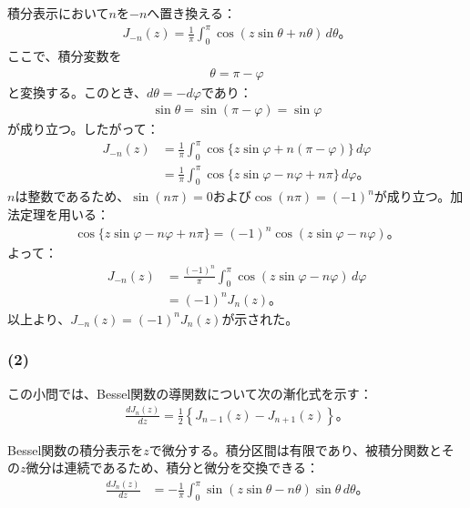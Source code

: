 \documentclass[platex,dvipdfmx,a4paper]{jsarticle}
\newcommand{\bbn}[2]{\frac{d #1}{d #2}}
\begin{document}
  積分表示において$n$を$-n$へ置き換える：
  \begin{align*}
    J_{-n}(z)
    =\frac{1}{\pi}\int_0^\pi\cos(z\sin\theta+n\theta)\,d\theta。
  \end{align*}
  ここで、積分変数を
  \begin{align*}
    \theta=\pi-\varphi
  \end{align*}
  と変換する。このとき、$d\theta=-d\varphi$であり：
  \begin{align*}
    \sin\theta=\sin(\pi-\varphi)=\sin\varphi
  \end{align*}
  が成り立つ。したがって：
  \begin{align*}
    J_{-n}(z)
    &=\frac{1}{\pi}\int_0^\pi
    \cos\{z\sin\varphi+n(\pi-\varphi)\}\,d\varphi\\
    &=\frac{1}{\pi}\int_0^\pi
    \cos\{z\sin\varphi-n\varphi+n\pi\}\,d\varphi。
  \end{align*}
  $n$は整数であるため、$\sin(n\pi)=0$および$\cos(n\pi)=(-1)^n$が成り立つ。加法定理を用いる：
  \begin{align*}
    \cos\{z\sin\varphi-n\varphi+n\pi\}
    =(-1)^n\cos(z\sin\varphi-n\varphi)。
  \end{align*}
  よって：
  \begin{align*}
    J_{-n}(z)
    &=\frac{(-1)^n}{\pi}
    \int_0^\pi\cos(z\sin\varphi-n\varphi)\,d\varphi\\
    &=(-1)^nJ_n(z)。
  \end{align*}
  以上より、$J_{-n}(z)=(-1)^nJ_n(z)$が示された。

  \subsubsection*{(2)}

  この小問では、Bessel関数の導関数について次の漸化式を示す：
  \begin{align*}
    \bbn{J_n(z)}{z}
    =\frac{1}{2}\left\{J_{n-1}(z)-J_{n+1}(z)\right\}。
  \end{align*}

  Bessel関数の積分表示を$z$で微分する。積分区間は有限であり、被積分関数とその$z$微分は連続であるため、積分と微分を交換できる：
  \begin{align*}
    \bbn{J_n(z)}{z}
    &=-\frac{1}{\pi}\int_0^\pi
    \sin(z\sin\theta-n\theta)\sin\theta\,d\theta。
  \end{align*}
\end{document}

